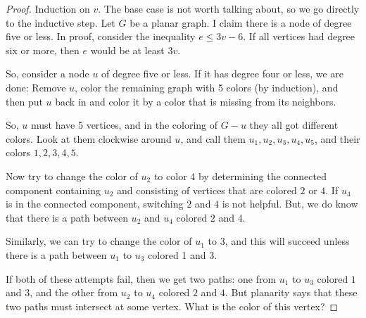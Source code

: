 \documentclass[11pt]{article}
\begin{document}
\begin{proof}  Induction on $v$.  The base case is not worth talking about,
so we go directly to the inductive step. Let $G$ be a planar graph.  I
claim there is a node of degree five or less. In proof, consider the
inequality $e\leq 3v -6$.  If all vertices had degree six or more,
then $e$ would be at least $3v$.

So, consider a node $u$ of degree five or less.  If it has degree
four or less, we are done:  Remove $u$, color the remaining graph
with 5 colors (by induction), and then put $u$ back in and color it
by a color that is missing from its neighbors.

So, $u$ must have 5 vertices, and in the coloring of $G-u$ they all
got different colors.  Look at them clockwise around $u$, and call
them $u_1,u_2,u_3,u_4,u_5$, and their colors $1,2,3,4,5$.  

Now try to change the color of $u_2$ to color 4 by determining
the connected component containing $u_2$ and consisting of vertices
that are colored $2$ or $4$.  If $u_4$ is in the connected
component, switching $2$ and $4$ is not helpful.  But,
we do know that there is a path between $u_2$
and $u_4$ colored $2$ and $4$. 



Similarly, we can try to change the color of $u_1$ to $3$, and this will
succeed unless there is a path between $u_1$ to $u_3$ colored 1 and 3.

If both of these attempts fail, then we get two paths: one from $u_1$ to $u_3$
colored $1$ and $3$, and the other from $u_2$ to $u_4$ colored $2$ and $4$. But
planarity says that these two paths must intersect at some vertex.  What is the
color of this vertex?
\end{proof}
\end{document}
